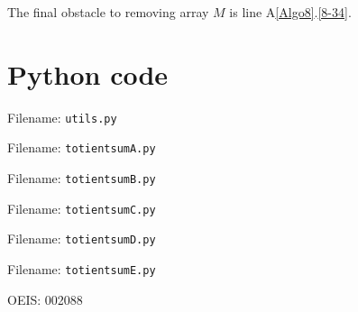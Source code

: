 \documentclass[12pt]{article}
\newcommand{\floor}[1]{{\left\lfloor #1 \right\rfloor}}
\newcommand{\showcode}[1]{Filename: \texttt{#1.py} }
\newcommand{\isqrt}[1]{\floor{\sqrt{#1}}}
\begin{document}
The final obstacle to removing array $M$ is line A\ref{Algo8}.\ref{8-34}.












\section{Python code}


Filename: \texttt{utils.py}

Filename: \texttt{totientsumA.py}
%

Filename: \texttt{totientsumB.py}
%

Filename: \texttt{totientsumC.py}
%

Filename: \texttt{totientsumD.py}
%

Filename: \texttt{totientsumE.py}
%



\nocite{*}

OEIS: 002088

\setlength{\bibitemsep}{\parskip}
\printbibliography[heading=bibnumbered]
\end{document}
